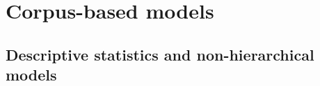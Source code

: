 \documentclass[USenglish]{article}
\begin{document}


\section{Corpus-based models}
\label{sec:corpusmodels}

%
%
%



\subsection{Descriptive statistics and non-hierarchical models}
\label{ssec:corpusnonhierarchicalmodel}



\end{document}
